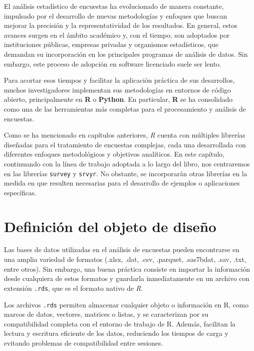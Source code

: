 \documentclass[
  spanish,
  12pt,
]{book}
\begin{document}
El análisis estadístico de encuestas ha evolucionado de manera constante, impulsado por el desarrollo de nuevas metodologías y enfoques que buscan mejorar la precisión y la representatividad de los resultados. En general, estos avances surgen en el ámbito académico y, con el tiempo, son adoptados por instituciones públicas, empresas privadas y organismos estadísticos, que demandan su incorporación en los principales programas de análisis de datos. Sin embargo, este proceso de adopción en software licenciado suele ser lento.

Para acortar esos tiempos y facilitar la aplicación práctica de sus desarrollos, muchos investigadores implementan sus metodologías en entornos de código abierto, principalmente en \textbf{R} o \textbf{Python}. En particular, \textbf{R} se ha consolidado como una de las herramientas más completas para el procesamiento y análisis de encuestas.

Como se ha mencionado en capítulos anteriores, \emph{R} cuenta con múltiples librerías diseñadas para el tratamiento de encuestas complejas, cada una desarrollada con diferentes enfoques metodológicos y objetivos analíticos. En este capítulo, continuando con la línea de trabajo adoptada a lo largo del libro, nos centraremos en las librerías \texttt{survey} y \texttt{srvyr}. No obstante, se incorporarán otras librerías en la medida en que resulten necesarias para el desarrollo de ejemplos o aplicaciones específicas.

\section{Definición del objeto de diseño}\label{definiciuxf3n-del-objeto-de-diseuxf1o}

Las bases de datos utilizadas en el análisis de encuestas pueden encontrarse en una amplia variedad de formatos (.xlsx, .dat, .csv, .parquet, .sas7bdat, .sav, .txt, entre otros). Sin embargo, una buena práctica consiste en importar la información desde cualquiera de estos formatos y guardarla inmediatamente en un archivo con extensión \texttt{.rds}, que es el formato nativo de \emph{R}.

Los archivos \texttt{.rds} permiten almacenar cualquier objeto o información en R, como marcos de datos, vectores, matrices o listas, y se caracterizan por su compatibilidad completa con el entorno de trabajo de R. Además, facilitan la lectura y escritura eficiente de los datos, reduciendo los tiempos de carga y evitando problemas de compatibilidad entre sesiones.
\end{document}
